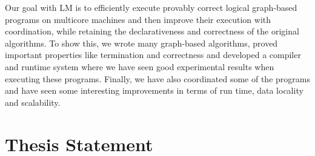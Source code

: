 Our goal with LM is to efficiently execute provably correct logical graph-based
programs on multicore machines and then improve their execution with
coordination, while retaining the declarativeness and correctness of the
original algorithms. To show this, we wrote many graph-based algorithms, proved
important properties like termination and correctness and developed a compiler
and runtime system where we have seen good experimental results when executing
these programs. Finally, we have also coordinated some of the programs and have
seen some interesting improvements in terms of run time, data locality and
scalability.

\section{Thesis Statement}



